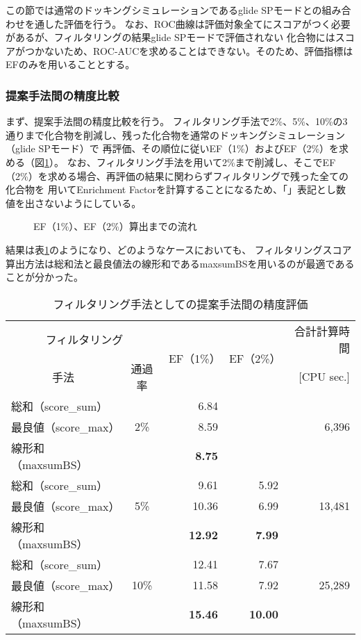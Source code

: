 この節では通常のドッキングシミュレーションであるglide SPモードとの組み合わせを通した評価を行う。
なお、ROC曲線は評価対象全てにスコアがつく必要があるが、フィルタリングの結果glide SPモードで評価されない
化合物にはスコアがつかないため、ROC-AUCを求めることはできない。そのため、評価指標はEFのみを用いることとする。

\subsubsection{提案手法間の精度比較}\label{subsubsec:filtering_proposal}
まず、提案手法間の精度比較を行う。
フィルタリング手法で2\%、5\%、10\%の3通りまで化合物を削減し、残った化合物を通常のドッキングシミュレーション（glide SPモード）で
再評価、その順位に従いEF（1\%）およびEF（2\%）を求める（図\ref{fig:filtering_image}）。
なお、フィルタリング手法を用いて2\%まで削減し、そこでEF（2\%）を求める場合、再評価の結果に関わらずフィルタリングで残った全ての化合物を
用いてEnrichment Factorを計算することになるため、「\textendash」表記とし数値を出さないようにしている。

\begin{figure}[htp]
 \begin{center}
  \caption{EF（1\%）、EF（2\%）算出までの流れ}
  \label{fig:filtering_image}
 \end{center}
\end{figure}

結果は表\ref{table:filtering_proposal}のようになり、どのようなケースにおいても、
フィルタリングスコア算出方法は総和法と最良値法の線形和であるmaxsumBSを用いるのが最適であることが分かった。

\begin{table}[htb] \centering
	\caption{フィルタリング手法としての提案手法間の精度評価}
	\label{table:filtering_proposal}
	\begin{tabular}{lc|rr|r|}
	\multicolumn{2}{c|}{フィルタリング}	&\multirow{2}{*}{EF（1\%）}	&\multirow{2}{*}{EF（2\%）}	&合計計算時間	\\
	\multicolumn{1}{c}{手法}	&通過率	&						&						&[CPU sec.]		\\ \hline
	総和（score\_sum）		&		&6.84					&\textendash				&				\\
	最良値（score\_max）	&2\%	&8.59					&\textendash				&6,396			\\
	線形和（maxsumBS）	&		&\textbf{8.75}				&\textendash				&				\\ \hline
	総和（score\_sum）		&		&9.61					&5.92					&				\\
	最良値（score\_max）	&5\%	&10.36					&6.99					&13,481			\\
	線形和（maxsumBS）	&		&\textbf{12.92}			&\textbf{7.99}				&				\\ \hline
	総和（score\_sum）		&		&12.41					&7.67					&				\\
	最良値（score\_max）	&10\%	&11.58					&7.92					&25,289			\\
	線形和（maxsumBS）	&		&\textbf{15.46}			&\textbf{10.00}			&				\\ \hline
	\end{tabular}
\end{table}


